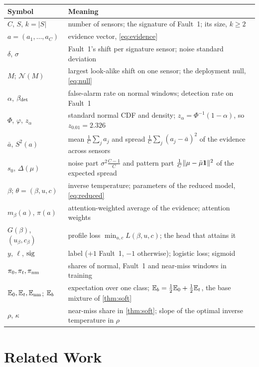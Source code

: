 \begin{center}\small
\renewcommand{\arraystretch}{1.25}
\begin{tabular}{@{}ll@{}}
\toprule
Symbol & Meaning\\
\midrule
$C$, $S$, $k=|S|$ & number of sensors; the signature of Fault~1; its size, $k\ge2$\\
$a=(a_1,\dots,a_C)$ & evidence vector, \cref{eq:evidence}\\
$\delta$, $\sigma$ & Fault~1's shift per signature sensor; noise standard deviation\\
$M$; $\mathcal N(M)$ & largest look-alike shift on one sensor; the deployment null, \cref{eq:null}\\
$\alpha$, $\beta_{\mathrm{det}}$ & false-alarm rate on normal windows; detection rate on Fault~1\\
$\Phi$, $\varphi$, $z_\alpha$ & standard normal CDF and density; $z_\alpha=\Phi^{-1}(1-\alpha)$, so $z_{0.01}=2.326$\\
$\bar a$, $S^2(a)$ & mean $\frac1C\sum_ja_j$ and spread $\frac1C\sum_j(a_j-\bar a)^2$ of the evidence across sensors\\
$s_0$, $\Delta(\mu)$ & noise part $\sigma^2\frac{C-1}{C}$ and pattern part $\frac1C\|\mu-\bar\mu\mathbf{1}\|^2$ of the expected spread\\
$\beta$; $\theta=(\beta,u,c)$ & inverse temperature; parameters of the reduced model, \cref{eq:reduced}\\
$m_\beta(a)$, $\pi(a)$ & attention-weighted average of the evidence; attention weights\\
$G(\beta)$, $(u_\beta,c_\beta)$ & profile loss $\min_{u,c}L(\beta,u,c)$; the head that attains it\\
$y$, $\ell$, $\operatorname{sig}$ & label ($+1$ Fault~1, $-1$ otherwise); logistic loss; sigmoid\\
$\pi_0,\pi_t,\pi_{\mathrm{nm}}$ & shares of normal, Fault~1 and near-miss windows in training\\
$\mathbb{E}_0,\mathbb{E}_t,\mathbb{E}_{\mathrm{nm}}$; $\mathbb{E}_b$ & expectation over one class; $\mathbb{E}_b=\frac12\mathbb{E}_0+\frac12\mathbb{E}_t$, the base mixture of \cref{thm:soft}\\
$\rho$, $\kappa$ & near-miss share in \cref{thm:soft}; slope of the optimal inverse temperature in $\rho$\\
\bottomrule
\end{tabular}
\end{center}

\section{Related Work}\label{app:related}

